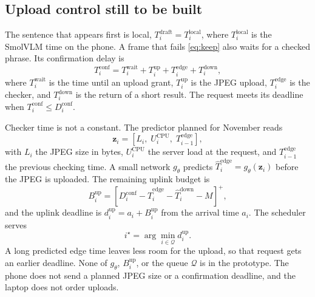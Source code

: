 \subsection{Upload control still to be built}

The sentence that appears first is local,
$T_i^{\mathrm{draft}}=T_i^{\mathrm{local}}$,
where $T_i^{\mathrm{local}}$ is the SmolVLM time on the phone. A frame that
fails \eqref{eq:keep} also waits for a checked phrase. Its confirmation
delay is
\begin{equation}
\label{eq:conf}
T_i^{\mathrm{conf}}
=
T_i^{\mathrm{wait}}
+
T_i^{\mathrm{up}}
+
T_i^{\mathrm{edge}}
+
T_i^{\mathrm{down}},
\end{equation}
where $T_i^{\mathrm{wait}}$ is the time until an upload grant,
$T_i^{\mathrm{up}}$ is the JPEG upload, $T_i^{\mathrm{edge}}$ is the checker,
and $T_i^{\mathrm{down}}$ is the return of a short result. The request meets
its deadline when $T_i^{\mathrm{conf}}\le D_i^{\mathrm{conf}}$.

Checker time is not a constant. The predictor planned for November reads
\begin{equation}
\mathbf{z}_i
=
\left[
L_i,\;
U_i^{\mathrm{CPU}},\;
T_{i-1}^{\mathrm{edge}}
\right],
\end{equation}
with $L_i$ the JPEG size in bytes, $U_i^{\mathrm{CPU}}$ the server load at
the request, and $T_{i-1}^{\mathrm{edge}}$ the previous checking time. A
small network $g_\theta$ predicts $\hat T_i^{\mathrm{edge}}=g_\theta(\mathbf{z}_i)$
before the JPEG is uploaded. The remaining uplink budget is
\begin{equation}
\label{eq:budget}
B_i^{\mathrm{up}}
=
\left[
D_i^{\mathrm{conf}}
-
\hat T_i^{\mathrm{edge}}
-
\hat T_i^{\mathrm{down}}
-
M
\right]^+,
\end{equation}
and the uplink deadline is $d_i^{\mathrm{up}}=a_i+B_i^{\mathrm{up}}$ from
the arrival time $a_i$. The scheduler serves
\begin{equation}
i^\star=\arg\min_{i\in\mathcal{Q}} d_i^{\mathrm{up}}.
\end{equation}
A long predicted edge time leaves less room for the upload, so that request
gets an earlier deadline. None of $g_\theta$, $B_i^{\mathrm{up}}$, or the
queue $\mathcal{Q}$ is in the prototype. The phone does not send a planned
JPEG size or a confirmation deadline, and the laptop does not order
uploads.
